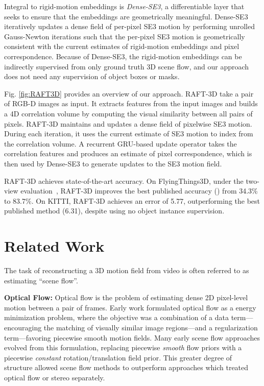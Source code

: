 \documentclass[final]{cvpr}
\begin{document}
Integral to rigid-motion embeddings is \emph{Dense-SE3}, a differentiable layer that seeks to ensure that the embeddings are geometrically meaningful. Dense-SE3 iteratively updates a dense field of per-pixel SE3 motion by performing unrolled Gauss-Newton iterations such that the per-pixel SE3 motion is geometrically consistent with the current estimates of rigid-motion embeddings and pixel correspondence. Because of Dense-SE3,  the rigid-motion embeddings can be indirectly supervised from only ground truth 3D scene flow, and our approach does not need any supervision of object boxes or masks. 

Fig. \ref{fig:RAFT3D} provides an overview of our approach. RAFT-3D take a pair of RGB-D images as input. It extracts features from the input images and builds a 4D correlation volume by computing the visual similarity between all pairs of pixels.  RAFT-3D maintains and updates a dense field of pixelwise SE3 motion. During each iteration, it uses the current estimate of SE3 motion to index from the correlation volume. A recurrent GRU-based update operator takes the correlation features and produces an estimate of pixel correspondence, which is then used by Dense-SE3 to generate updates to the SE3 motion field. 

RAFT-3D achieves state-of-the-art accuracy. 
On FlyingThings3D, under the two-view evaluation~\cite{liu2019flownet3d}, RAFT-3D improves the best published accuracy () from 34.3\% to 83.7\%. On KITTI, RAFT-3D achieves an error of 5.77, outperforming the best published method (6.31), despite using no object instance supervision. 

\section{Related Work}

The task of reconstructing a 3D motion field from video is often referred to as estimating ``scene flow''. 

\vspace{1mm} \noindent \textbf{Optical Flow:} Optical flow is the problem of estimating dense 2D pixel-level motion between a pair of frames. Early work formulated optical flow as a energy minimization problem, where the objective was a combination of a data term---encouraging the matching of visually similar image regions---and a regularization term---favoring piecewise smooth motion fields. Many early scene flow approaches evolved from this formulation, replacing piecewise \emph{smooth} flow priors with a piecewise \emph{constant} rotation/translation field prior\cite{vogel2013piecewise,menze2015object}. This greater degree of structure allowed scene flow methods to outperform approaches which treated optical flow or stereo separately\cite{vogel20113d}.
\end{document}
